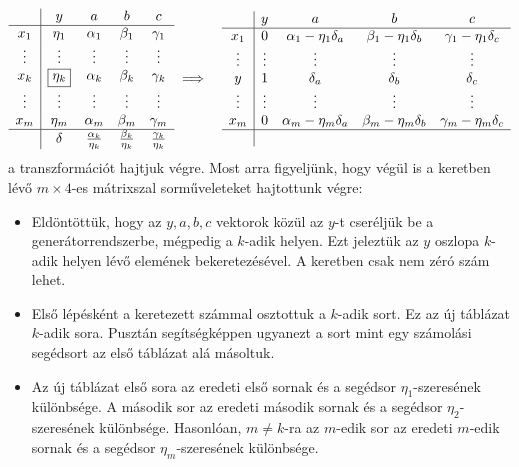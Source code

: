 \documentclass[9pt, showtrims]{memoir}
\theoremstyle{plain}
\theoremstyle{remark}
\theoremstyle{definition}
\begin{document}
\begin{eqnarray*}
    \begin{array}{c|cccc}
        &y      &a        &b         &c\\
        \hline
        x_1         &\eta_1  &\alpha_1 &\beta_1 &\gamma_1 \\
        \vdots      &\vdots &\vdots    &\vdots  &\vdots\\
        x_k         &\boxed{\eta_k}  &\alpha_k&\beta_k&\gamma_k   \\
        \vdots      &\vdots &\vdots    &\vdots&\vdots\\
        x_m         &\eta_m  &\alpha_m   &\beta_m&\gamma_m\\
        \hline
        &\delta &\frac{\alpha_k}{\eta_k}&\frac{\beta_k}{\eta_k}&\frac{\gamma_k}{\eta_k}\\
    \end{array}
    &\implies&
    \begin{array}{c|cccc}
        &y      &a         &b        &c\\
        \hline
        x_1         &0  &\alpha_1-\eta_1\delta_a   &\beta_1-\eta_1\delta_b&\gamma_1-\eta_1\delta_c\\
        \vdots      &\vdots &\vdots&\vdots&\vdots    \\
        y           &1  &\delta_a&\delta_b&\delta_c  \\
        \vdots      &\vdots &\vdots &\vdots &\vdots    \\
        x_m         &0  &\alpha_m-\eta_m\delta_a&\beta_m-\eta_m\delta_b&\gamma_m-\eta_m\delta_c   \\
        \hline
        &&
    \end{array}
\end{eqnarray*}
a transzformációt hajtjuk végre.
Most arra figyeljünk, 
hogy végül is a keretben lévő $m\times 4$-es mátrixszal sorműveleteket hajtottunk végre:
\begin{itemize}
    \item 
        Eldöntöttük, hogy az $y,a,b,c$ vektorok közül az $y$-t cseréljük be a generátorrendszerbe,
        mégpedig a $k$-adik helyen. 
        Ezt jeleztük az $y$ oszlopa $k$-adik helyen lévő elemének bekeretezésével. 
        A keretben csak nem zéró szám lehet.
    \item 
        Első lépésként a keretezett számmal osztottuk a $k$-adik sort. Ez az új táblázat $k$-adik sora.
        Pusztán segítségképpen ugyanezt a sort mint egy számolási segédsort az első táblázat alá másoltuk.
    \item 
        Az új táblázat első sora az eredeti első sornak és a segédsor $\eta_1$-szeresének különbsége.
        A második sor az eredeti második sornak és a segédsor $\eta_2$-szeresének különbsége.
        Hasonlóan, $m\neq k$-ra az $m$-edik sor az eredeti $m$-edik sornak és a segédsor $\eta_m$-szeresének különbsége.
\end{itemize}
\end{document}
